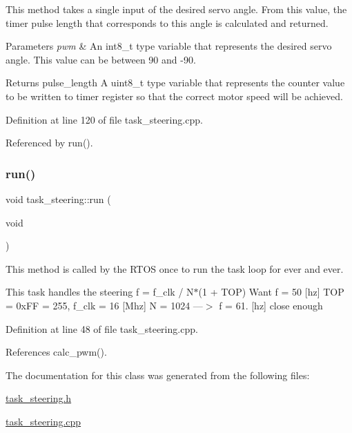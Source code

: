 This method takes a single input of the desired servo angle. From this value, the timer pulse length that corresponds to this angle is calculated and returned. 
\begin{DoxyParams}{Parameters}
{\em pwm} & An int8\+\_\+t type variable that represents the desired servo angle. This value can be between 90 and -\/90. \\
\hline
\end{DoxyParams}
\begin{DoxyReturn}{Returns}
pulse\+\_\+length A uint8\+\_\+t type variable that represents the counter value to be written to timer register so that the correct motor speed will be achieved. 
\end{DoxyReturn}


Definition at line 120 of file task\+\_\+steering.\+cpp.



Referenced by run().

\mbox{\label{classtask__steering_a223e9f1d50c0c48ff5326b7ae01ae689}} 
\subsubsection{\texorpdfstring{run()}{run()}}
{\footnotesize\ttfamily void task\+\_\+steering\+::run (\begin{DoxyParamCaption}\item[{void}]{ }\end{DoxyParamCaption})}

This method is called by the R\+T\+OS once to run the task loop for ever and ever.

This task handles the steering f = f\+\_\+clk / N$\ast$(1 + T\+OP) Want f = 50 \mbox{[}hz\mbox{]} T\+OP = 0x\+FF = 255, f\+\_\+clk = 16 \mbox{[}Mhz\mbox{]} N = 1024 ---$>$ f = 61. \mbox{[}hz\mbox{]} close enough

Definition at line 48 of file task\+\_\+steering.\+cpp.



References calc\+\_\+pwm().



The documentation for this class was generated from the following files\+:\begin{DoxyCompactItemize}
\item 
\mbox{\hyperlink{task__steering_8h}{task\+\_\+steering.\+h}}\item 
\mbox{\hyperlink{task__steering_8cpp}{task\+\_\+steering.\+cpp}}\end{DoxyCompactItemize}
